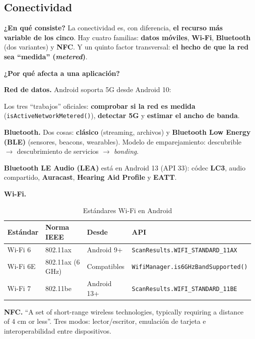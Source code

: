\documentclass[11pt,a4paper]{article}
\newcommand{\code}[1]{\texttt{\color{ink}#1}}
\newcommand{\campo}[1]{\textbf{\color{ink}#1}}
\begin{document}
	\subsection{Conectividad}
	
	\campo{¿En qué consiste?}
	La conectividad es, con diferencia, \textbf{el recurso más variable de los cinco}. Hay cuatro familias: \textbf{datos móviles}, \textbf{Wi-Fi}, \textbf{Bluetooth} (dos variantes) y \textbf{NFC}. Y un quinto factor transversal: \textbf{el hecho de que la red sea \enquote{medida} (\emph{metered})}.
	
	\textbf{\color{primary}¿Por qué afecta a una aplicación?}
	
	\textbf{Red de datos.} Android soporta 5G desde Android 10:
	
	Los tres \enquote{trabajos} oficiales: \textbf{comprobar si la red es medida} (\code{isActiveNetworkMetered()}), \textbf{detectar 5G} y \textbf{estimar el ancho de banda}.
	
	\textbf{Bluetooth.} Dos cosas: \textbf{clásico} (streaming, archivos) y \textbf{Bluetooth Low Energy (BLE)} (sensores, beacons, wearables). Modelo de emparejamiento: descubrible $\to$ descubrimiento de servicios $\to$ \emph{bonding}.
	
	\textbf{Bluetooth LE Audio (LEA)} está en Android 13 (API 33): códec \textbf{LC3}, audio compartido, \textbf{Auracast}, \textbf{Hearing Aid Profile} y \textbf{EATT}.
	
	\textbf{Wi-Fi.}
	
	\begin{table}[htbp]
		\centering
		\small
		\begin{tabular}{@{}l l l l@{}}
			\toprule
			\rowcolor{primary}
			\textcolor{paper}{\sffamily\bfseries Estándar} & \textcolor{paper}{\sffamily\bfseries Norma IEEE} & \textcolor{paper}{\sffamily\bfseries Desde} & \textcolor{paper}{\sffamily\bfseries API} \\
			\midrule
			Wi-Fi 6 & 802.11ax & Android 9+ & \code{ScanResults.WIFI\_STANDARD\_11AX} \\
			\rowcolor{soft}
			Wi-Fi 6E & 802.11ax (6 GHz) & Compatibles & \code{WifiManager.is6GHzBandSupported()} \\
			Wi-Fi 7 & 802.11be & Android 13+ & \code{ScanResults.WIFI\_STANDARD\_11BE} \\
			\bottomrule
		\end{tabular}
		\caption{Estándares Wi-Fi en Android}
	\end{table}
	
	\textbf{NFC.} \enquote{A set of short-range wireless technologies, typically requiring a distance of 4 cm or less}. Tres modos: lector/escritor, emulación de tarjeta e interoperabilidad entre dispositivos.
	
\end{document}
